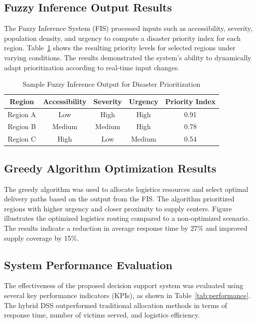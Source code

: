 \documentclass[journal,final,a4paper,twoside,11pt]{IEEEtran}
\begin{document}
\subsection{Fuzzy Inference Output Results}
The Fuzzy Inference System (FIS) processed inputs such as accessibility, severity, population density, and urgency to compute a disaster priority index for each region. Table~\ref{tab:fuzzyoutput} shows the resulting priority levels for selected regions under varying conditions. The results demonstrated the system’s ability to dynamically adapt prioritization according to real-time input changes.

\begin{table}[htbp]
\caption{Sample Fuzzy Inference Output for Disaster Prioritization}
\begin{center}
\begin{tabular}{|c|c|c|c|c|}
\hline
\textbf{Region} & \textbf{Accessibility} & \textbf{Severity} & \textbf{Urgency} & \textbf{Priority Index} \\
\hline
Region A & Low & High & High & 0.91 \\
Region B & Medium & Medium & High & 0.78 \\
Region C & High & Low & Medium & 0.54 \\
\hline
\end{tabular}
\label{tab:fuzzyoutput}
\end{center}
\end{table}

\subsection{Greedy Algorithm Optimization Results}
The greedy algorithm was used to allocate logistics resources and select optimal delivery paths based on the output from the FIS. The algorithm prioritized regions with higher urgency and closer proximity to supply centers. Figure~ illustrates the optimized logistics routing compared to a non-optimized scenario. The results indicate a reduction in average response time by 27\% and improved supply coverage by 15\%.



\subsection{System Performance Evaluation}
The effectiveness of the proposed decision support system was evaluated using several key performance indicators (KPIs), as shown in Table~\ref{tab:performance}. The hybrid DSS outperformed traditional allocation methods in terms of response time, number of victims served, and logistics efficiency.
\end{document}

